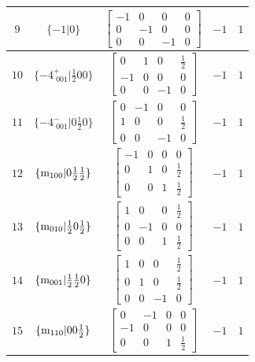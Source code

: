 \documentclass[fleqn,8pt]{jsarticle}
\begin{document}
\begin{longtable}{ccccc}
$ 9 $ & $ \{-1|0\} $ & $ \begin{bmatrix} -1 & 0 & 0 & 0 \\ 0 & -1 & 0 & 0 \\ 0 & 0 & -1 & 0 \end{bmatrix} $ & $ -1 $ & $ 1 $ \\ \hline
$ 10 $ & $ \{-4^{+}_{\,\,001}|\frac{1}{2} 0 0\} $ & $ \begin{bmatrix} 0 & 1 & 0 & \frac{1}{2} \\ -1 & 0 & 0 & 0 \\ 0 & 0 & -1 & 0 \end{bmatrix} $ & $ -1 $ & $ 1 $ \\ \hline
$ 11 $ & $ \{-4^{-}_{\,\,001}|0 \frac{1}{2} 0\} $ & $ \begin{bmatrix} 0 & -1 & 0 & 0 \\ 1 & 0 & 0 & \frac{1}{2} \\ 0 & 0 & -1 & 0 \end{bmatrix} $ & $ -1 $ & $ 1 $ \\ \hline
$ 12 $ & $ \{{\rm m}_{100}|0 \frac{1}{2} \frac{1}{2}\} $ & $ \begin{bmatrix} -1 & 0 & 0 & 0 \\ 0 & 1 & 0 & \frac{1}{2} \\ 0 & 0 & 1 & \frac{1}{2} \end{bmatrix} $ & $ -1 $ & $ 1 $ \\ \hline
$ 13 $ & $ \{{\rm m}_{010}|\frac{1}{2} 0 \frac{1}{2}\} $ & $ \begin{bmatrix} 1 & 0 & 0 & \frac{1}{2} \\ 0 & -1 & 0 & 0 \\ 0 & 0 & 1 & \frac{1}{2} \end{bmatrix} $ & $ -1 $ & $ 1 $ \\ \hline
$ 14 $ & $ \{{\rm m}_{001}|\frac{1}{2} \frac{1}{2} 0\} $ & $ \begin{bmatrix} 1 & 0 & 0 & \frac{1}{2} \\ 0 & 1 & 0 & \frac{1}{2} \\ 0 & 0 & -1 & 0 \end{bmatrix} $ & $ -1 $ & $ 1 $ \\ \hline
$ 15 $ & $ \{{\rm m}_{110}|0 0 \frac{1}{2}\} $ & $ \begin{bmatrix} 0 & -1 & 0 & 0 \\ -1 & 0 & 0 & 0 \\ 0 & 0 & 1 & \frac{1}{2} \end{bmatrix} $ & $ -1 $ & $ 1 $ \\ \hline

\end{longtable}
\end{document}
